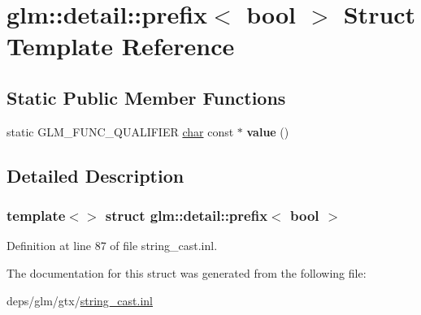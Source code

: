 \hypertarget{structglm_1_1detail_1_1prefix_3_01bool_01_4}{}\section{glm\+:\+:detail\+:\+:prefix$<$ bool $>$ Struct Template Reference}
\label{structglm_1_1detail_1_1prefix_3_01bool_01_4}
\subsection*{Static Public Member Functions}
\begin{DoxyCompactItemize}
\item 
\mbox{\label{structglm_1_1detail_1_1prefix_3_01bool_01_4_ab6d6392aa906c684f1abdda98830adad}} 
static G\+L\+M\+\_\+\+F\+U\+N\+C\+\_\+\+Q\+U\+A\+L\+I\+F\+I\+ER \hyperlink{classchar}{char} const  $\ast$ {\bfseries value} ()
\end{DoxyCompactItemize}


\subsection{Detailed Description}
\subsubsection*{template$<$$>$\newline
struct glm\+::detail\+::prefix$<$ bool $>$}



Definition at line 87 of file string\+\_\+cast.\+inl.



The documentation for this struct was generated from the following file\+:\begin{DoxyCompactItemize}
\item 
deps/glm/gtx/\hyperlink{string__cast_8inl}{string\+\_\+cast.\+inl}\end{DoxyCompactItemize}
